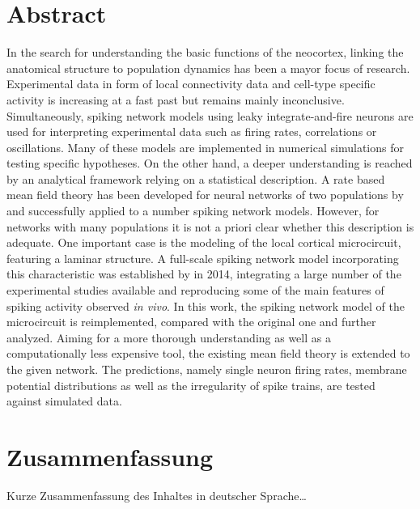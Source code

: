 \begingroup
\let\clearpage\relax
\let\cleardoublepage\relax
\let\cleardoublepage\relax

\section*{Abstract}
In the search for understanding the basic functions of the neocortex, 
linking the anatomical structure to population dynamics has been a mayor
focus of research. Experimental data in form of local connectivity data
and cell-type specific activity is increasing at a fast past but remains
mainly inconclusive. Simultaneously, spiking network models using 
leaky integrate-and-fire neurons 
are used for interpreting experimental data such as firing rates, 
correlations or oscillations. 
Many of these models are implemented in numerical 
simulations for testing specific hypotheses.
On the other hand, a deeper understanding is reached by 
an analytical framework relying on a statistical description.
A rate based mean field theory has been developed 
for neural networks of two populations
by  and successfully applied to a number 
spiking network models. However, for networks with many populations
it is not a priori clear whether this description is adequate. 
One important case is the modeling of the local cortical 
microcircuit, featuring a laminar structure. 
A full-scale spiking network model incorporating this characteristic
was established by  in 2014, 
integrating a large number of the experimental studies available and reproducing
some of the main features of spiking activity observed \textit{in vivo}.
In this work, the spiking network model of the microcircuit is reimplemented, 
compared with the original one and further analyzed.
Aiming for a more thorough understanding as well as a computationally less
expensive tool, the existing mean field theory is extended to the given network. 
The predictions, namely single neuron firing rates, 
membrane potential distributions as well as the irregularity of spike trains, 
are tested against simulated data. 

\vfill

\pagebreak
\section*{Zusammenfassung}
Kurze Zusammenfassung des Inhaltes in deutscher Sprache\dots


\endgroup			

\vfill
